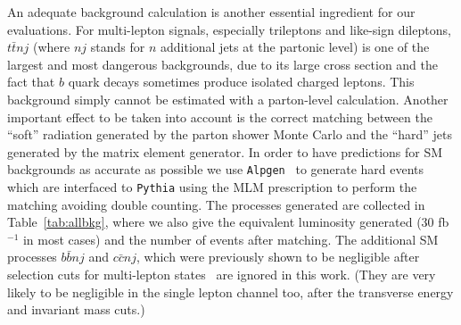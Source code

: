 \documentclass[12pt,a4paper]{article}
\begin{document}
An adequate background calculation is another essential ingredient for our evaluations.
For multi-lepton signals, especially trileptons and like-sign dileptons, $t \bar t nj$ (where $nj$ stands for $n$ additional jets at the partonic level) is one of the largest and most dangerous backgrounds, due to its large cross section and the fact that $b$ quark decays sometimes produce isolated charged leptons. This background simply cannot be estimated with a parton-level calculation. Another important effect to be taken into account is the correct matching between the ``soft'' radiation generated by the parton shower Monte Carlo and the ``hard'' jets generated by the matrix element generator.
In order to have predictions for SM backgrounds as accurate as possible we use {\tt Alpgen}~\cite{Mangano:2002ea} to generate hard events which are interfaced to {\tt Pythia}
using the MLM prescription \cite{mlm} to perform the matching avoiding double counting.
The processes generated are collected in Table~\ref{tab:allbkg}, where we also give the equivalent luminosity generated (30 fb$^{-1}$ in most cases) and the number of events after matching. The additional SM processes $b \bar b nj$ and $c \bar c nj$, which were previously shown to be negligible after selection cuts for multi-lepton states~\cite{delAguila:2008cj} are ignored in this work. (They are very likely to be negligible in the single lepton channel too, after the transverse energy and invariant mass cuts.)
\end{document}
